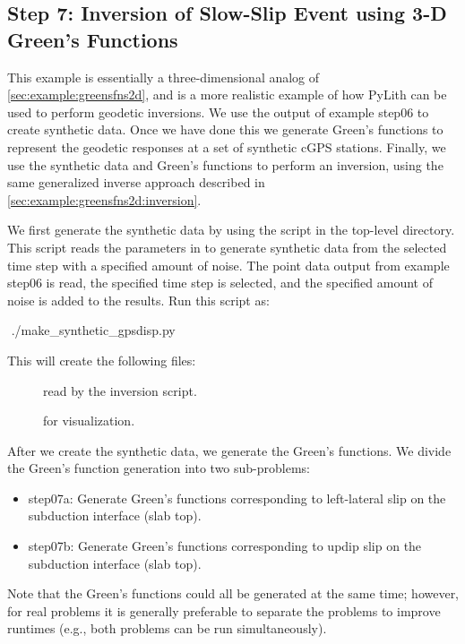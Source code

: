 \subsection{Step 7: Inversion of Slow-Slip Event using 3-D Green's Functions}

This example is essentially a three-dimensional analog of
\vref{sec:example:greensfns2d}, and is a more realistic example of how
PyLith can be used to perform geodetic inversions. We use the output
of example step06 to create synthetic data. Once we have done this we
generate Green's functions to represent the geodetic responses at a
set of synthetic cGPS stations. Finally, we use the synthetic data and
Green's functions to perform an inversion, using the same generalized
inverse approach described in \vref{sec:example:greensfns2d:inversion}.

We first generate the synthetic data by using the script
 in the top-level
directory. This script reads the parameters in
 to generate synthetic data
from the selected time step with a specified amount of noise. The
point data output from example step06 is read, the specified time step
is selected, and the specified amount of noise is added to the
results. Run this script as:
\begin{shell}
$$ ./make_synthetic_gpsdisp.py
\end{shell}
This will create the following files:
\begin{description}
\item[] read by the
  inversion script.
\item[] for visualization.
\end{description}

After we create the synthetic data, we generate the Green's
functions. We divide the Green's function generation into two sub-problems:
\begin{itemize}
 \item step07a:  Generate Green's functions corresponding to
   left-lateral slip on the subduction interface (slab top).
 \item step07b:  Generate Green's functions corresponding to
   updip slip on the subduction interface (slab top).
\end{itemize}
Note that the Green's functions could all be generated at the same
time; however, for real problems it is generally preferable to
separate the problems to improve runtimes (e.g., both problems can be
run simultaneously).

